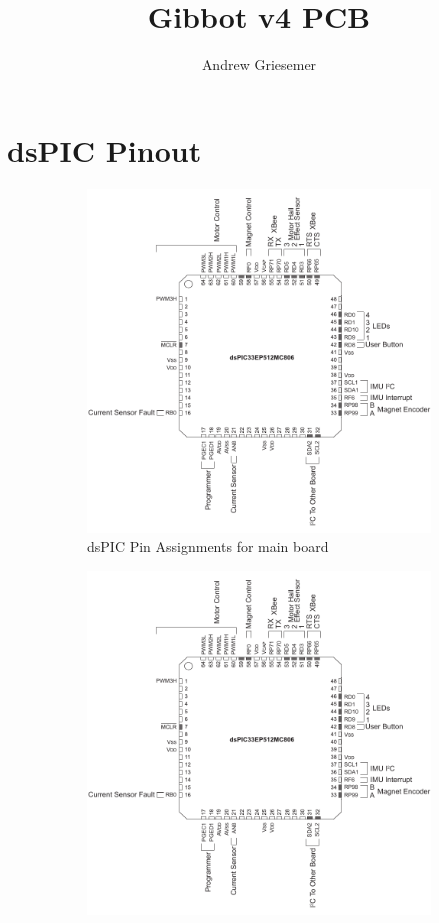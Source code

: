 \documentclass{article}
\begin{document}
\title{Gibbot v4 PCB}
\author{Andrew Griesemer}
\maketitle
\section{dsPIC Pinout}
\begin{figure}[h!]
	\centering
	\begin{subfigure}{0.4\textwidth}
		\includegraphics[width=\textwidth, page=1]{breakout}
		\caption{dsPIC Pin Assignments for main board}
		\label{pinout1}
	\end{subfigure}
	\begin{subfigure}{0.4\textwidth}
		\includegraphics[width=\textwidth, page=2]{breakout}

\end{subfigure}
\end{figure}
\end{document}
